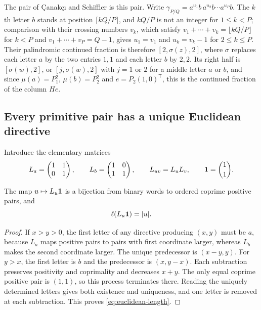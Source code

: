 The pair of \c{C}anak\c{c}{\i} and Schiffler is this pair. Write
$\gamma_{P/Q}=a^{u_1}b\,a^{u_2}b\cdots a^{u_P}b$. The $k$th letter $b$ stands at
position $\lceil kQ/P\rceil$, and $kQ/P$ is not an integer for $1\leqslant k<P$;
comparison with their crossing numbers $v_k$, which satisfy
$v_1+\cdots+v_k=\lfloor kQ/P\rfloor$ for $k<P$ and $v_1+\cdots+v_P=Q-1$, gives
$u_1=v_1$ and $u_k=v_k-1$ for $2\leqslant k\leqslant P$. Their palindromic
continued fraction is therefore $[2,\sigma(z),2]$, where $\sigma$ replaces each
letter $a$ by the two entries $1,1$ and each letter $b$ by $2,2$. Its right
half is $[\sigma(w),2]$, or $[j,\sigma(w),2]$ with $j=1$ or $2$ for a middle
letter $a$ or $b$, and since $\mu(a)=P_1^2$, $\mu(b)=P_2^2$ and $e=P_2(1,0)^{\mathsf T}$,
this is the continued fraction of the column $He$.

\subsection{Every primitive pair has a unique Euclidean directive}

Introduce the elementary matrices
\begin{equation}\label{eq:directive-incidence}
 L_a=\begin{pmatrix}1&1\\0&1\end{pmatrix},\qquad
 L_b=\begin{pmatrix}1&0\\1&1\end{pmatrix},\qquad
 L_{uv}=L_uL_v,\qquad {\bf1}=\binom11.
\end{equation}

\begin{lemma}\label{lem:euclidean-bijection}
The map $u\mapsto L_u{\bf1}$ is a bijection from binary words to
ordered coprime positive pairs, and
\begin{equation}\label{eq:euclidean-length}
 \ell(L_u{\bf1})=|u|.
\end{equation}
\end{lemma}

\begin{proof}
If $x>y>0$, the first letter of any directive producing $(x,y)$ must
be $a$, because $L_a$ maps positive pairs to pairs with first coordinate
larger, whereas $L_b$ makes the second coordinate larger. The unique
predecessor is $(x-y,y)$. For $y>x$, the first letter is $b$ and the
predecessor is $(x,y-x)$. Each subtraction preserves positivity and
coprimality and decreases $x+y$. The only equal coprime positive pair
is $(1,1)$, so this process terminates there. Reading the uniquely
determined letters gives both existence and uniqueness, and one letter
is removed at each subtraction. This proves
\eqref{eq:euclidean-length}.
\end{proof}

